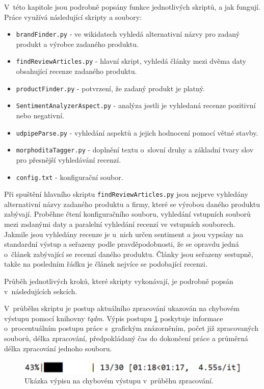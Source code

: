 V~této kapitole jsou podrobně popsány funkce jednotlivých skriptů, a jak fungují. Práce využívá následující skripty a soubory:

\begin{itemize}
    \item \verb|brandFinder.py| - ve wikidatech vyhledá alternativní názvy pro zadaný produkt a výrobce zadaného produktu.
    \item \verb|findReviewArticles.py| - hlavní skript, vyhledá články mezi dvěma daty obsahující recenze zadaného produktu.
    \item \verb|productFinder.py| - potvrzení, že zadaný produkt je platný.
    \item \verb|SentimentAnalyzerAspect.py| - analýza jestli je vyhledaná recenze pozitivní nebo negativní.
    \item \verb|udpipeParse.py| - vyhledání aspektů a jejich hodnocení pomocí větné stavby.
    \item \verb|morphoditaTagger.py| - doplnění textu o~slovní druhy a základní tvary slov pro přesnější vyhledávání recenzí.
    \item \verb|config.txt| - konfigurační soubor.
\end{itemize}

Při spuštění hlavního skriptu \verb|findReviewArticles.py| jsou nejprve vyhledány alternativní názvy zadaného produktu a firmy, které se výrobou daného produktu zabývají. Proběhne čtení konfiguračního souboru, vyhledání vstupních souborů mezi zadanými daty a paralelní vyhledání recenzí ve vstupních souborech. Jakmile jsou vyhledány recenze je u~nich určen sentiment a jsou vypsány na standardní výstup a seřazeny podle pravděpodobnosti, že se opravdu jedná o~článek zabývající se recenzí daného produktu. Články jsou seřazeny sestupně, takže na posledním řádku je článek nejvíce se podobající recenzi.

Průběh jednotlivých kroků, které skripty vykonávají, je podrobně popsán v~následujících sekcích.

V~průběhu skriptu je postup aktuálního zpracování ukazován na chybovém výstupu pomocí knihovny \textit{tqdm}. Výpis postupu \ref{fig:vypis_zpracovani} poskytuje informace o~procentuálním postupu práce s~grafickým znázorněním, počet již zpracovaných souborů, délka zpracování, předpokládaný čas do dokončení práce a průměrná délka zpracování jednoho souboru.
\begin{figure}[h]
    \centering
    \includegraphics[scale=0.5]{obrazky-figures/vypis_zpracovani.pdf}
    \caption{Ukázka výpisu na chybovém výstupu v~průběhu zpracování.}
    \label{fig:vypis_zpracovani}
\end{figure}

